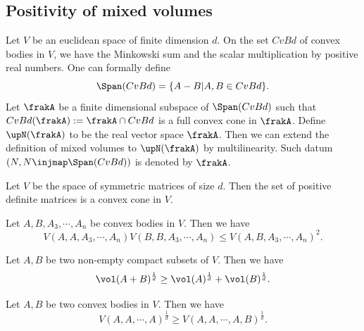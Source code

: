 \subsection{Positivity of mixed volumes}

  Let $V$ be an euclidean space of finite dimension $d$.
  On the set $CvBd$ of convex bodies in $V$, we have the Minkowski sum and the scalar multiplication by positive real numbers.
  One can formally define 
  \[ \Span(CvBd) = \{A - B | A, B \in CvBd\}. \]
  Let $\frakA$ be a finite dimensional subspace of $\Span(CvBd)$ such that $CvBd(\frakA) := \frakA \cap CvBd$ is a full convex cone in $\frakA$.  
  Define $\upN(\frakA)$ to be the real vector space $\frakA$.
  Then we can extend the definition of mixed volumes to $\upN(\frakA)$ by multilinearity.
  Such datum $(N,N \injmap \Span(CvBd))$ is denoted by $\frakA$.

  \begin{example}
    Let $V$ be the space of symmetric matrices of size $d$.
    Then the set of positive definite matrices is a convex cone in $V$.
   \Yang{}
    
  \end{example}


  \begin{theorem}
    Let $A, B, A_3, \cdots, A_n$ be convex bodies in $V$.
    Then we have
    \[V(A, A, A_3, \cdots, A_n) V(B, B, A_3, \cdots, A_n) \leq V(A, B, A_3, \cdots, A_n)^2.\]
    \Yang{} 
  \end{theorem}

  \begin{theorem}
    Let $A, B$ be two non-empty compact subsets of $V$.
    Then we have
    \[\vol(A + B)^{\frac{1}{d}} \geq \vol(A)^{\frac{1}{d}} + \vol(B)^{\frac{1}{d}}.\]
    \Yang{}
  \end{theorem}

  \begin{theorem}
    Let $A, B$ be two convex bodies in $V$.
    Then we have
    \[V(A, A, \cdots, A)^{\frac{1}{d}} \geq V(A, A, \cdots, A, B)^{\frac{1}{d}}.\]
      \Yang{}
  \end{theorem}

